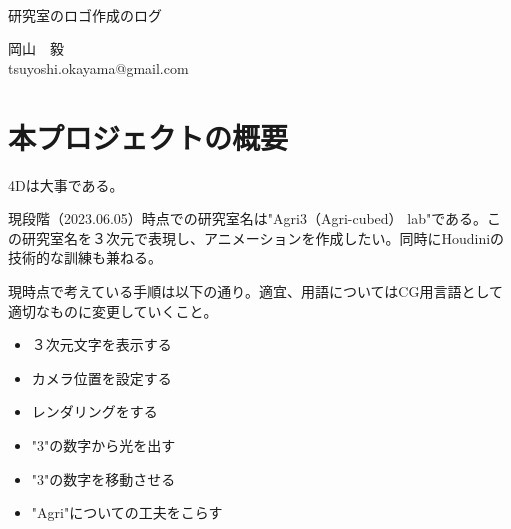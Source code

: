 \documentclass[uplatex,dvipdfmx]{jsarticle}
\begin{document}
\begin{titlepage}
  \noindent %
  \\ \\ \\ \\ \\ \\ \\ \\ 
  \begin{center}
  \begin{LARGE}
  
    研究室のロゴ作成のログ

  \end{LARGE}
  \end{center}
  \vspace{7cm}
  \begin{center}
  \begin{LARGE}
  岡山　毅\\
  tsuyoshi.okayama@gmail.com
  \end{LARGE}
  \end{center}
\end{titlepage}
\newpage

\tableofcontents
\newpage

\section{本プロジェクトの概要}

4Dは大事である\cite{Schunck2021}。

現段階（2023.06.05）時点での研究室名は"Agri3（Agri-cubed） lab"である。この研究室名を３次元で表現し、アニメーションを作成したい。同時にHoudiniの技術的な訓練も兼ねる。

現時点で考えている手順は以下の通り。適宜、用語についてはCG用言語として適切なものに変更していくこと。

\bigskip
\begin{itemize}
  \item ３次元文字を表示する
  \item カメラ位置を設定する
  \item レンダリングをする
  \item "3"の数字から光を出す
  \item "3"の数字を移動させる
  \item "Agri"についての工夫をこらす
\end{itemize}

\printbibliography
\end{document}
